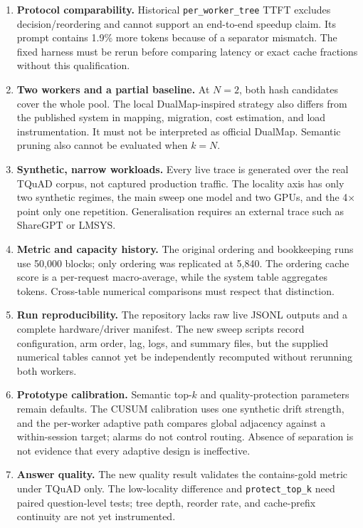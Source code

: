 \documentclass[conference]{IEEEtran}
\begin{document}
\begin{enumerate}
  \item \textbf{Protocol comparability.} Historical
  \texttt{per\_worker\_tree} TTFT excludes decision/reordering and cannot
  support an end-to-end speedup claim. Its prompt contains 1.9\% more
  tokens because of a separator mismatch. The fixed harness must be
  rerun before comparing latency or exact cache fractions without this
  qualification.
  \item \textbf{Two workers and a partial baseline.} At $N{=}2$, both
  hash candidates cover the whole pool. The local DualMap-inspired
  strategy also differs from the published system in mapping,
  migration, cost estimation, and load instrumentation. It must not be
  interpreted as official DualMap. Semantic pruning also cannot be
  evaluated when $k=N$.
  \item \textbf{Synthetic, narrow workloads.} Every live trace is
  generated over the real TQuAD corpus, not captured production traffic.
  The locality axis has only two synthetic regimes, the main sweep one
  model and two GPUs, and the 4$\times$ point only one repetition.
  Generalisation requires an external trace such as ShareGPT or LMSYS.
  \item \textbf{Metric and capacity history.} The original ordering and
  bookkeeping runs use 50{,}000 blocks; only ordering was replicated at
  5{,}840. The ordering cache score is a per-request macro-average, while
  the system table aggregates tokens. Cross-table numerical comparisons
  must respect that distinction.
  \item \textbf{Run reproducibility.} The repository lacks raw live
  JSONL outputs and a complete hardware/driver manifest. The new sweep
  scripts record configuration, arm order, lag, logs, and summary files,
  but the supplied numerical tables cannot yet be independently
  recomputed without rerunning both workers.
  \item \textbf{Prototype calibration.} Semantic top-$k$ and
  quality-protection parameters remain defaults. The CUSUM calibration
  uses one synthetic drift strength, and the per-worker adaptive path
  compares global adjacency against a within-session target; alarms do
  not control routing. Absence of separation is not evidence that every
  adaptive design is ineffective.
  \item \textbf{Answer quality.} The new quality result validates the
  contains-gold metric under TQuAD only. The low-locality difference and
  \texttt{protect\_top\_k} need paired question-level tests; tree depth,
  reorder rate, and cache-prefix continuity are not yet instrumented.
\end{enumerate}
\end{document}
